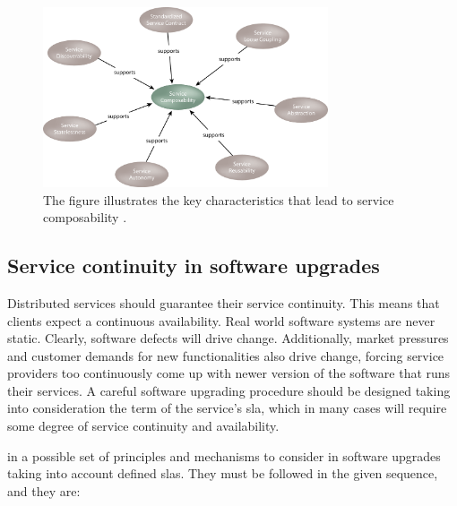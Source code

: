 \begin{figure}
	\centering{}
	\includegraphics[width=0.75\textwidth]{chapters/elasticity/images/composability.png}
	\caption[Characterstics for service composability]{The figure illustrates the key characteristics that
		lead to service composability \cite{serviceComposability}.}
	\label{img:elasticity-requirements-composability}
\end{figure}

\subsection*{Service continuity in software upgrades}
\label{sec:elasticity-requirements-serviceContinutiy}
Distributed services should guarantee their service continuity. This means that clients expect a
continuous availability. Real world software systems are never static. Clearly, software defects will
drive change. Additionally, market pressures and customer demands for new functionalities also drive
change, forcing service providers too continuously come up with newer version of the software that
runs their services. A careful software upgrading procedure should be designed taking into consideration
the term of the service's \ac{sla}, which in many cases will require some degree of service continuity
and availability.

\citeauthor{li2011evaluating} in \cite{li2011evaluating} a possible set of principles and mechanisms to
consider in software upgrades taking into account defined \ac{sla}s. They must be followed in the given
sequence, and they are:

